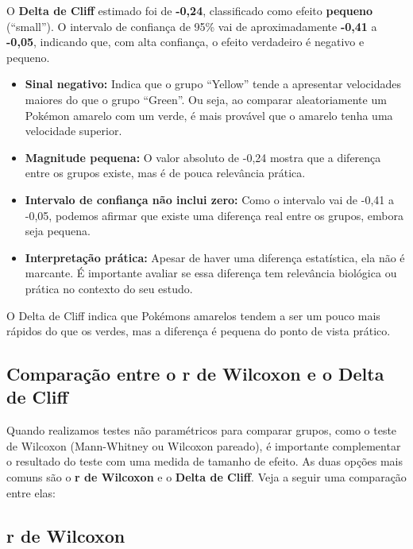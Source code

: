 \documentclass[
]{book}
\providecommand{\tightlist}{%
  \setlength{\itemsep}{0pt}\setlength{\parskip}{0pt}}
\begin{document}
O \textbf{Delta de Cliff} estimado foi de \textbf{-0,24}, classificado como efeito \textbf{pequeno} (``small''). O intervalo de confiança de 95\% vai de aproximadamente \textbf{-0,41} a \textbf{-0,05}, indicando que, com alta confiança, o efeito verdadeiro é negativo e pequeno.

\begin{itemize}
\tightlist
\item
  \textbf{Sinal negativo:} Indica que o grupo ``Yellow'' tende a apresentar velocidades maiores do que o grupo ``Green''. Ou seja, ao comparar aleatoriamente um Pokémon amarelo com um verde, é mais provável que o amarelo tenha uma velocidade superior.
\item
  \textbf{Magnitude pequena:} O valor absoluto de -0,24 mostra que a diferença entre os grupos existe, mas é de pouca relevância prática.
\item
  \textbf{Intervalo de confiança não inclui zero:} Como o intervalo vai de -0,41 a -0,05, podemos afirmar que existe uma diferença real entre os grupos, embora seja pequena.
\item
  \textbf{Interpretação prática:} Apesar de haver uma diferença estatística, ela não é marcante. É importante avaliar se essa diferença tem relevância biológica ou prática no contexto do seu estudo.
\end{itemize}

O Delta de Cliff indica que Pokémons amarelos tendem a ser um pouco mais rápidos do que os verdes, mas a diferença é pequena do ponto de vista prático.

\subsection{Comparação entre o r de Wilcoxon e o Delta de Cliff}\label{comparauxe7uxe3o-entre-o-r-de-wilcoxon-e-o-delta-de-cliff}

Quando realizamos testes não paramétricos para comparar grupos, como o teste de Wilcoxon (Mann-Whitney ou Wilcoxon pareado), é importante complementar o resultado do teste com uma medida de tamanho de efeito. As duas opções mais comuns são o \textbf{r de Wilcoxon} e o \textbf{Delta de Cliff}. Veja a seguir uma comparação entre elas:

\subsection{r de Wilcoxon}\label{r-de-wilcoxon}
\end{document}
